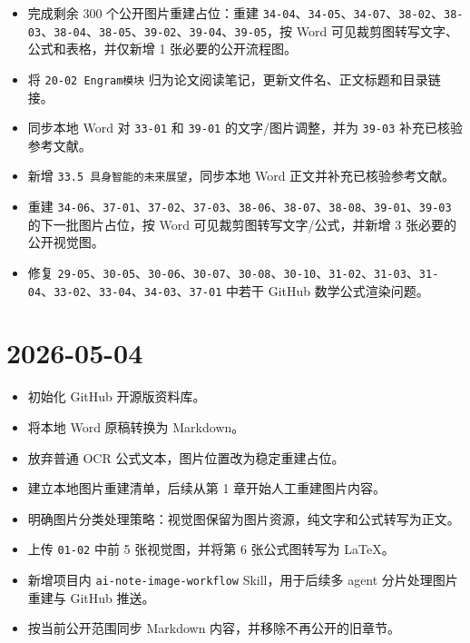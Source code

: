 \begin{itemize}
\tightlist
\item
  完成剩余 300 个公开图片重建占位：重建 \texttt{34-04}、\texttt{34-05}、\texttt{34-07}、\texttt{38-02}、\texttt{38-03}、\texttt{38-04}、\texttt{38-05}、\texttt{39-02}、\texttt{39-04}、\texttt{39-05}，按 Word 可见裁剪图转写文字、公式和表格，并仅新增 1 张必要的公开流程图。
\item
  将 \texttt{20-02\ Engram模块} 归为论文阅读笔记，更新文件名、正文标题和目录链接。
\item
  同步本地 Word 对 \texttt{33-01} 和 \texttt{39-01} 的文字/图片调整，并为 \texttt{39-03} 补充已核验参考文献。
\item
  新增 \texttt{33.5\ 具身智能的未来展望}，同步本地 Word 正文并补充已核验参考文献。
\item
  重建 \texttt{34-06}、\texttt{37-01}、\texttt{37-02}、\texttt{37-03}、\texttt{38-06}、\texttt{38-07}、\texttt{38-08}、\texttt{39-01}、\texttt{39-03} 的下一批图片占位，按 Word 可见裁剪图转写文字/公式，并新增 3 张必要的公开视觉图。
\item
  修复 \texttt{29-05}、\texttt{30-05}、\texttt{30-06}、\texttt{30-07}、\texttt{30-08}、\texttt{30-10}、\texttt{31-02}、\texttt{31-03}、\texttt{31-04}、\texttt{33-02}、\texttt{33-04}、\texttt{34-03}、\texttt{37-01} 中若干 GitHub 数学公式渲染问题。
\end{itemize}

\hypertarget{section-7}{%
\section{2026-05-04}\label{section-7}}

\begin{itemize}
\tightlist
\item
  初始化 GitHub 开源版资料库。
\item
  将本地 Word 原稿转换为 Markdown。
\item
  放弃普通 OCR 公式文本，图片位置改为稳定重建占位。
\item
  建立本地图片重建清单，后续从第 1 章开始人工重建图片内容。
\item
  明确图片分类处理策略：视觉图保留为图片资源，纯文字和公式转写为正文。
\item
  上传 \texttt{01-02} 中前 5 张视觉图，并将第 6 张公式图转写为 LaTeX。
\item
  新增项目内 \texttt{ai-note-image-workflow} Skill，用于后续多 agent 分片处理图片重建与 GitHub 推送。
\item
  按当前公开范围同步 Markdown 内容，并移除不再公开的旧章节。
\end{itemize}

\clearpage
